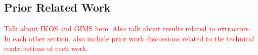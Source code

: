 \subsection{Prior Related Work}\label{sec:prior}
\textcolor{red}{Talk about IKOS and GIMS here. Also talk about results related to extractors. In each other section, also include prior work discussions related to the technical contributions of each work.}